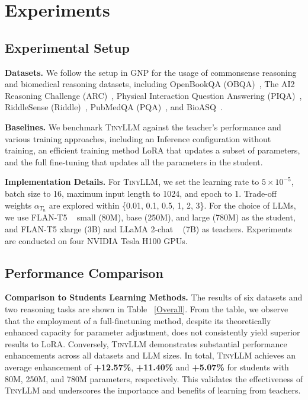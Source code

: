 \documentclass[sigconf,nonacm]{acmart}
\newcommand{\ours}{\textsc{TinyLLM}\xspace}
\begin{document}
\section{Experiments}


\subsection{Experimental Setup}

\textbf{Datasets.} 
We follow the setup in GNP \cite{gnp} for the usage of commonsense reasoning and biomedical reasoning datasets, including OpenBookQA (OBQA)~\cite{OpenBookQA2018}, The AI2 Reasoning Challenge (ARC)~\cite{Clark2018ThinkYH}, Physical Interaction Question Answering (PIQA)~\cite{Bisk2020PIQA}, RiddleSense (Riddle)~\cite{lin-etal-2021-riddlesense}, PubMedQA (PQA)~\cite{jin2019pubmedqa}, and BioASQ~\cite{Tsatsaronis2015BIOASQ}.


\noindent \textbf{Baselines.} 
We benchmark \ours against the teacher's performance and various training approaches, including an Inference configuration without training, an efficient training method LoRA \cite{hu2022lora} that updates a subset of parameters, and the full fine-tuning that updates all the parameters in the student.


\noindent \textbf{Implementation Details.} For \ours, we set the learning rate to \(5 \times 10^{-5}\), batch size to 16, maximum input length to 1024, and epoch to 1. Trade-off weights \(\alpha_{T_n}\) are explored within \{0.01, 0.1, 0.5, 1, 2, 3\}. For the choice of LLMs, we use FLAN-T5 ~\cite{chung2022scaling} small (80M), base (250M), and large (780M) as the student, and FLAN-T5 xlarge (3B) and LLaMA 2-chat ~\cite{touvron2023llama2} (7B) as teachers. Experiments are conducted on four NVIDIA Tesla H100 GPUs.


\subsection{Performance Comparison}
\textbf{Comparison to Students Learning Methods.}
The results of six datasets and two reasoning tasks are shown in Table ~\ref{Overall}. From the table, we observe that the employment of a full-finetuning method, despite its theoretically enhanced capacity for parameter adjustment, does not consistently yield superior results to LoRA. Conversely, \ours demonstrates substantial performance enhancements across all datasets and LLM sizes. In total, \ours achieves an average enhancement of \textbf{+12.57\%}, \textbf{+11.40\%} and \textbf{+5.07\%} for students with 80M, 250M, and 780M parameters, respectively. This validates the effectiveness of \ours and underscores the importance and benefits of learning from teachers.
\end{document}
